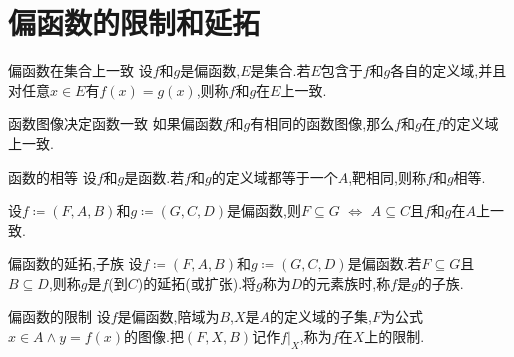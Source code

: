 \section{偏函数的限制和延拓}

\begin{definition}{偏函数在集合上一致}{}
	设$f$和$g$是偏函数,$E$是集合.若$E$包含于$f$和$g$各自的定义域,并且对任意$x\in E$有$f\left(x\right)=g\left(x\right)$,则称$f$和$g$在$E$上一致.
\end{definition}

\begin{proposition}{函数图像决定函数一致}{}
	如果偏函数$f$和$g$有相同的函数图像,那么$f$和$g$在$f$的定义域上一致.
\end{proposition}

\begin{definition}{函数的相等}{}
	设$f$和$g$是函数.若$f$和$g$的定义域都等于一个$A$,靶相同,则称$f$和$g$相等.
\end{definition}

\begin{proposition}{}{}
	设$f\coloneq\left(F,A,B\right)$和$g\coloneq\left(G,C,D\right)$是偏函数,则$F\subseteq G$ $\iff$ $A\subseteq C$且$f$和$g$在$A$上一致.
\end{proposition}

\begin{definition}{偏函数的延拓,子族}{}
	设$f\coloneq\left(F,A,B\right)$和$g\coloneq\left(G,C,D\right)$是偏函数.若$F\subseteq G$且$B\subseteq D$,则称$g$是$f$(到$C$)的延拓(或扩张).将$g$称为$D$的元素族时,称$f$是$g$的子族.
\end{definition}

\begin{definition}{偏函数的限制}{}
	设$f$是偏函数,陪域为$B$,$X$是$A$的定义域的子集,$F$为公式$x\in A\wedge y=f\left(x\right)$的图像.把$\left(F,X,B\right)$记作$f|_{X}$,称为$f$在$X$上的限制.
\end{definition}

